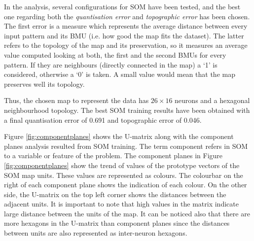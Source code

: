 \documentclass[a4paper,10pt,twocolumn,preprint,3p]{elsarticle}
\begin{document}
In the analysis, several configurations for SOM have been tested, and the best one regarding both the \textit{quantisation error} and \textit{topographic error} has been chosen. The first error is a measure which represents the average distance between every input pattern and its BMU (i.e. how good the map fits the dataset). The latter refers to the topology of the map and its preservation, so it measures an average value computed looking at both, the first and the second BMUs for every pattern. If they are neighbours (directly connected in the map) a `1' is considered, otherwise a `0' is taken. A small value would mean that the map preserves well its topology.

Thus, the chosen map to represent the data has $26 \times 16$ neurons and a hexagonal neighbourhood topology. The best SOM training results have been obtained with a final quantisation error of 0.691 and topographic error of 0.046.


Figure \ref{fig:componentplanes} shows the U-matrix along with the component 
planes analysis resulted from SOM training. The term component refers in SOM 
to a variable or feature of the problem.
The component planes in Figure \ref{fig:componentplanes} show the trend of 
values of the prototype vectors of the SOM map units. These values are represented 
as colours. The colourbar on the right of each component plane shows the indication 
of each colour. On the other side, the U-matrix on the top
left corner shows the distances between the adjacent units. It is
important to note that high values in the matrix indicate large
distance between the units of the map. It can be noticed also that
there are more hexagons in the U-matrix than component planes since
the distances between units are also represented as inter-neuron hexagons. 
\end{document}
